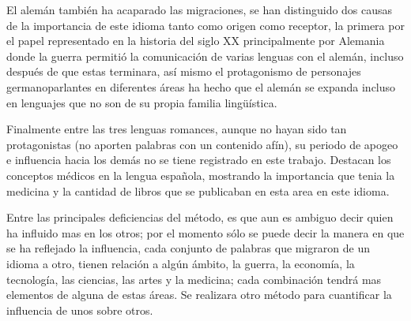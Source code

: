 El alemán también ha acaparado las migraciones, se han distinguido dos causas de la importancia de este idioma tanto como origen como receptor, la primera por el papel representado en la historia del siglo XX principalmente por Alemania donde la guerra permitió la comunicación de varias lenguas con el alemán, incluso después de que estas terminara, así mismo el protagonismo de personajes germanoparlantes en diferentes áreas ha hecho que el alemán se expanda incluso en lenguajes que no son de su propia familia lingüística. 

Finalmente entre las tres lenguas romances, aunque no hayan sido tan protagonistas (no aporten palabras con un contenido afín),  su periodo de apogeo e influencia hacia los demás no se tiene registrado en este trabajo. Destacan los conceptos médicos en la lengua española, mostrando la importancia que tenia la medicina y la cantidad de libros que se publicaban en esta area en este idioma. 

Entre las principales deficiencias del método, es que aun es ambiguo decir quien ha influido mas en los otros; por el momento sólo se puede decir la manera en que se ha reflejado la influencia, cada conjunto de palabras que migraron de un idioma a otro, tienen relación a algún ámbito, la guerra, la economía, la tecnología, las ciencias, las artes y la medicina; cada combinación tendrá mas elementos de alguna de estas áreas.  Se realizara otro método para cuantificar la influencia de unos sobre otros. 














	